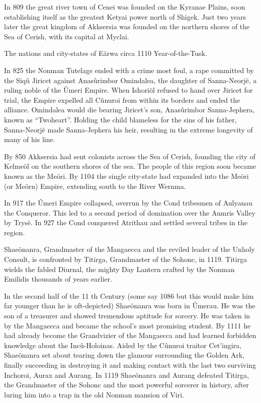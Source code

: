 \documentclass[]{book}
\begin{document}
In 809 the great river town of Cenei was founded on the Kyranae Plains, soon
establishing itself as the greatest Ketyai power north of Shigek. Just two years later the
great kingdom of Akksersia was founded on the northern shores of the Sea of Cerish,
with its capital at Myclai.

The nations and city-states of Eärwa circa 1110 Year-of-the-Tusk.

In 825 the Nonman Tutelage ended with a crime most foul, a rape committed by the
Siqû Jiricet against Anasûrimbor Omindalea, the daughter of Sanna-Neorjë, a ruling
noble of the Ûmeri Empire. When Ishoriöl refused to hand over Jiricet for trial, the
Empire expelled all Cûnuroi from within its borders and ended the alliance.
Omindalea would die bearing Jiricet's son, Anasûrimbor Sanna-Jephera, known as
``Twoheart''. Holding the child blameless for the sins of his father, Sanna-Neorjë made
Sanna-Jephera his heir, resulting in the extreme longevity of many of his line.

By 850 Akksersia had sent colonists across the Sea of Cerish, founding the city of
Kelmeöl on the southern shores of the sea. The people of this region soon became
known as the Meöri. By 1104 the single city-state had expanded into the Meöri (or
Meörn) Empire, extending south to the River Wernma.

In 917 the Ûmeri Empire collapsed, overrun by the Cond tribesmen of Aulyanau the
Conqueror. This led to a second period of domination over the Aumris Valley by
Trysë. In 927 the Cond conquered Atrithau and settled several tribes in the region.

Shaeönanra, Grandmaster of the Mangaecca and the reviled leader of the Unholy Consult, is confronted
by Titirga, Grandmaster of the Sohonc, in 1119. Titirga wields the fabled Diurnal, the mighty Day
Lantern crafted by the Nonman Emilidis thousands of years earlier.

In the second half of the 11 th Century (some say 1086 but this would make him far
younger than he is oft-depicted) Shaeönanra was born in Ûmerau. He was the son of a
treasurer and showed tremendous aptitude for sorcery. He was taken in by the
Mangaecca and became the school's most promising student. By 1111 he had already
become the Grandvizier of the Mangaecca and had learned forbidden knowledge about
the Incû-Holoinas. Aided by the Cûnuroi traitor Cet'ingira, Shaeönanra set about
tearing down the glamour surrounding the Golden Ark, finally succeeding in
destroying it and making contact with the last two surviving Inchoroi, Aurax and
Aurang. In 1119 Shaeönanra and Aurang defeated Titirga, the Grandmaster of the
Sohonc and the most powerful sorcerer in history, after luring him into a trap in the
old Nonman mansion of Viri.
\end{document}
